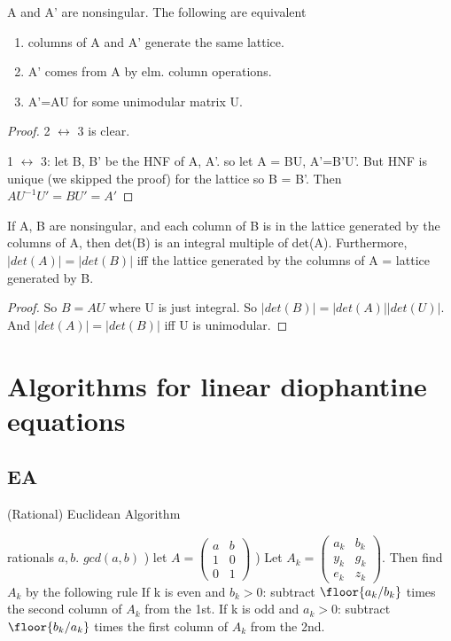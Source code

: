\begin{corollary}
A and A' are nonsingular. The following are equivalent
\begin{enumerate}
	\item columns of A and A' generate the same lattice.
	\item A' comes from A by elm. column operations.
	\item A'=AU for some unimodular matrix U.
\end{enumerate}
\end{corollary}
\begin{proof}
2 $\leftrightarrow$ 3 is clear.

1 $\leftrightarrow$ 3: let B, B' be the HNF of A, A'. so let A = BU, A'=B'U'. But HNF is unique (we skipped the proof) for the lattice so B = B'. Then $AU^{-1}U' = BU' = A'$
\end{proof}

\begin{corollary}
If A, B are nonsingular, and each column of B is in the lattice generated by the columns of A, then det(B) is an integral multiple of det(A). Furthermore, $|det(A)| = |det(B)|$ iff the lattice generated by the columns of A = lattice generated by B.
\end{corollary}
\begin{proof}
So $B = A U$ where U is just integral. So $|det(B)| = |det(A)| |det(U)|$. And $|det(A)| = |det(B)|$ iff U is unimodular.
\end{proof}

\section{Algorithms for linear diophantine equations}

\subsection{EA}

\begin{algorithm}                      
\caption{(Rational) Euclidean Algorithm}
\label{alg:EuclideanAlgorithm2}
\begin{algorithmic}                    
\REQUIRE rationals $a, b$.
\ENSURE $gcd(a,b)$
) let $A = \left(\begin{matrix} a & b \\ 1 & 0 \\ 0 & 1 \end{matrix} \right)$
) Let $A_k = \left(\begin{matrix} a_k & b_k \\ y_k & g_k \\ e_k & z_k \end{matrix} \right)$. Then find $A_k$ by the following rule
\STATE \;\;\;\; If k is even and $b_k > 0$: subtract $\floor{a_k/b_k}$ times the second column of $A_k$ from the 1st.
\STATE \;\;\;\; If k is odd and $a_k >0$: subtract $\floor{b_k/a_k}$ times the first column of $A_k$ from the 2nd. 
\end{algorithmic}
\end{algorithm}

